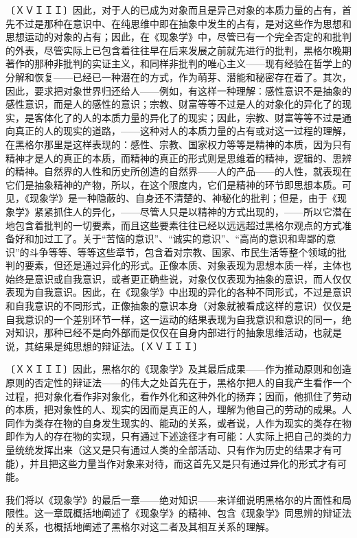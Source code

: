 \documentclass[a4paper,twoside,12pt]{ctexart}
\begin{document}
〔ＸＶＩＩＩ〕因此，对于人的已成为对象而且是异己对象的本质力量的占有，首先不过是那种在意识中、在纯思维中即在抽象中发生的占有，是对这些作为思想和思想运动的对象的占有；因此，在《现象学》中，尽管已有一个完全否定的和批判的外表，尽管实际上已包含着往往早在后来发展之前就先进行的批判，黑格尔晚期著作的那种非批判的实证主义，和同样非批判的唯心主义——现有经验在哲学上的分解和恢复——已经已一种潜在的方式，作为萌芽、潜能和秘密存在着了。其次，因此，要求把对象世界归还给人——例如，有这样一种理解︰感性意识不是抽象的感性意识，而是人的感性的意识；宗教、财富等等不过是人的对象化的异化了的现实，是客体化了的人的本质力量的异化了的现实；因此，宗教、财富等等不过是通向真正的人的现实的道路，——这种对人的本质力量的占有或对这一过程的理解，在黑格尔那里是这样表现的：感性、宗教、国家权力等等是精神的本质，因为只有精神才是人的真正的本质，而精神的真正的形式则是思维着的精神，逻辑的、思辨的精神。自然界的人性和历史所创造的自然界——人的产品——的人性，就表现在它们是抽象精神的产物，所以，在这个限度内，它们是精神的环节即思想本质。可见，《现象学》是一种隐蔽的、自身还不清楚的、神秘化的批判；但是，由于《现象学》紧紧抓住人的异化，——尽管人只是以精神的方式出现的，——所以它潜在地包含着批判的一切要素，而且这些要素往往已经以远远超过黑格尔观点的方式准备好和加过工了。关于“苦恼的意识”、“诚实的意识”、“高尚的意识和卑鄙的意识”的斗争等等、等等这些章节，包含着对宗教、国家、市民生活等整个领域的批判的要素，但还是通过异化的形式。正像本质、对象表现为思想本质一样，主体也始终是意识或自我意识，或者更正确些说，对象仅仅表现为抽象的意识，而人仅仅表现为自我意识。因此，在《现象学》中出现的异化的各种不同形式，不过是意识和自我意识的不同形式，正像抽象的意识本身（对象就被看成这样的意识）仅仅是自我意识的一个差别环节一样，这一运动的结果表现为自我意识和意识的同一，绝对知识，那种已经不是向外部而是仅仅在自身内部进行的抽象思维活动，也就是说，其结果是纯思想的辩证法。〔ＸＶＩＩＩ〕

〔ＸＸＩＩＩ〕因此，黑格尔的《现象学》及其最后成果——作为推动原则和创造原则的否定性的辩证法——的伟大之处首先在于，黑格尔把人的自我产生看作一个过程，把对象化看作非对象化，看作外化和这种外化的扬弃；因而，他抓住了劳动的本质，把对象性的人、现实的因而是真正的人，理解为他自己的劳动的成果。人同作为类存在物的自身发生现实的、能动的关系，或者说，人作为现实的类存在物即作为人的存在物的实现，只有通过下述途径才有可能：人实际上把自己的类的力量统统发挥出来（这又是只有通过人类的全部活动、只有作为历史的结果才有可能），并且把这些力量当作对象来对待，而这首先又是只有通过异化的形式才有可能。

我们将以《现象学》的最后一章——绝对知识——来详细说明黑格尔的片面性和局限性。这一章既概括地阐述了《现象学》的精神、包含《现象学》同思辨的辩证法的关系，也概括地阐述了黑格尔对这二者及其相互关系的理解。
\end{document}
